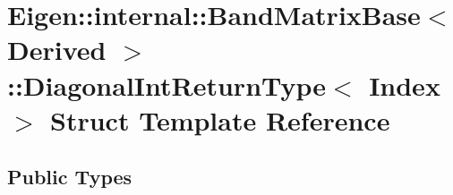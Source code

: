 \hypertarget{struct_eigen_1_1internal_1_1_band_matrix_base_1_1_diagonal_int_return_type}{}\section{Eigen\+:\+:internal\+:\+:Band\+Matrix\+Base$<$ Derived $>$\+:\+:Diagonal\+Int\+Return\+Type$<$ Index $>$ Struct Template Reference}
\label{struct_eigen_1_1internal_1_1_band_matrix_base_1_1_diagonal_int_return_type}
\subsection*{Public Types}
